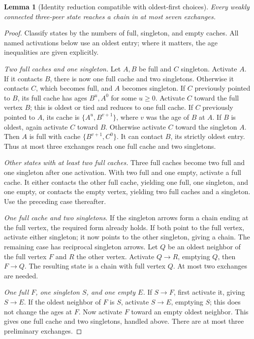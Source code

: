 \documentclass[11pt]{article}
\newtheorem{lemma}[theorem]{Lemma}
\begin{document}
\begin{lemma}[Identity reduction compatible with oldest-first choices]
\label{lem:chainreach}
Every weakly connected three-peer state reaches a chain in at most
seven exchanges.
\end{lemma}
\begin{proof}
Classify states by the numbers of full, singleton, and empty caches.
All named activations below use an oldest entry; where it matters,
the age inequalities are given explicitly.

\emph{Two full caches and one singleton.}
Let $A,B$ be full and $C$ singleton. Activate $A$.
If it contacts $B$, there is now one full cache and two singletons.
Otherwise it contacts $C$, which becomes full, and $A$ becomes
singleton. If $C$ previously pointed to $B$, its full cache has
ages $B^u,A^0$ for some $u\ge0$. Activate $C$ toward the full
vertex $B$; this is oldest or tied and reduces to one full cache.
If $C$ previously pointed to $A$, its cache is
$\{A^u,B^{v+1}\}$, where $v$ was the age of $B$ at $A$.
If $B$ is oldest, again activate $C$ toward $B$.
Otherwise activate $C$ toward the singleton $A$. Then $A$ is full
with cache $\{B^{v+1},C^0\}$. It can contact $B$, its strictly
oldest entry. Thus at most three exchanges reach one full cache
and two singletons.

\emph{Other states with at least two full caches.}
Three full caches become two full and one singleton after one
activation. With two full and one empty, activate a full cache.
It either contacts the other full cache, yielding one full, one
singleton, and one empty, or contacts the empty vertex, yielding
two full caches and a singleton. Use the preceding case thereafter.

\emph{One full cache and two singletons.}
If the singleton arrows form a chain ending at the full vertex,
the required form already holds. If both point to the full vertex,
activate either singleton; it now points to the other singleton,
giving a chain. The remaining case has reciprocal singleton arrows.
Let $Q$ be an oldest neighbor of the full vertex $F$ and $R$ the
other vertex. Activate $Q\to R$, emptying $Q$, then $F\to Q$.
The resulting state is a chain with full vertex $Q$.
At most two exchanges are needed.

\emph{One full $F$, one singleton $S$, and one empty $E$.}
If $S\to F$, first activate it, giving $S\to E$.
If the oldest neighbor of $F$ is $S$, activate $S\to E$, emptying
$S$; this does not change the ages at $F$.
Now activate $F$ toward an empty oldest neighbor.
This gives one full cache and two singletons, handled above.
There are at most three preliminary exchanges.


\end{proof}
\end{document}
